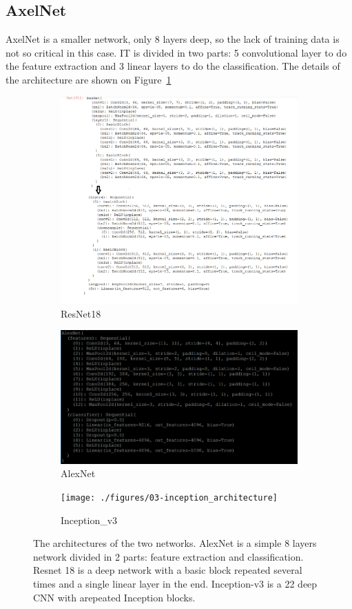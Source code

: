 \subsection{AxelNet}
AxelNet is a smaller network, only 8 layers deep, so the lack of training data is not so critical in this case. IT is divided in two parts: 5 convolutional layer to do the feature extraction and 3 linear layers to do the classification.  The details of the architecture are shown on Figure~\ref{fig:resarchi}
\begin{figure}
\begin{subfigure}{.5\textwidth}
  \centering
  \includegraphics[width=.8\linewidth]{./figures/03-Resnet_architecture}
  \caption{ResNet18}
  \label{fig:resarchi}
\end{subfigure}%
\begin{subfigure}{.5\textwidth}
  \centering
  \includegraphics[width=.8\linewidth]{./figures/03-alexnet_architecture}
  \caption{AlexNet}
  \label{fig:alexarchi}
\end{subfigure}
\begin{subfigure}{.5\textwidth}
  \centering
  \texttt{[image: ./figures/03-inception\_architecture]}
  \caption{Inception_v3}
  \label{fig:googarch}
\end{subfigure}
\caption[Networks architectures]{The architectures of the two networks. AlexNet is a simple 8 layers network divided in 2 parts: feature extraction and classification. Resnet 18 is a deep network with a basic block repeated several times and a single linear layer in the end. Inception-v3 is a 22 deep CNN with arepeated Inception blocks.}
\end{figure}

